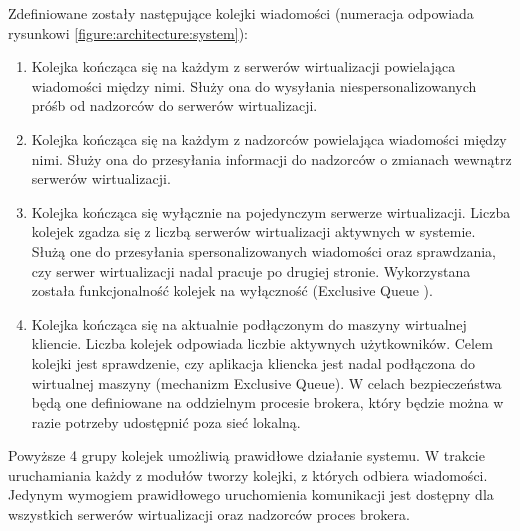 \documentclass[../opis-rozwiazania.tex]{subfiles}
\begin{document}
Zdefiniowane zostały następujące kolejki wiadomości (numeracja odpowiada rysunkowi \ref{figure:architecture:system}):
\begin{enumerate}[label=(\Roman*)]
  \item \label{modules:broker:queue-virtsrv} Kolejka kończąca się na każdym z serwerów wirtualizacji powielająca wiadomości między nimi.
        Służy ona do wysyłania niespersonalizowanych próśb od nadzorców do serwerów wirtualizacji.
  \item \label{modules:broker:queue-overseers} Kolejka kończąca się na każdym z nadzorców powielająca wiadomości między nimi.
        Służy ona do przesyłania informacji do nadzorców o zmianach wewnątrz serwerów wirtualizacji.
  \item \label{modules:broker:queue-exclusive} Kolejka kończąca się wyłącznie na pojedynczym serwerze wirtualizacji.
        Liczba kolejek zgadza się z liczbą serwerów wirtualizacji aktywnych w systemie.
        Służą one do przesyłania spersonalizowanych wiadomości oraz sprawdzania, czy serwer wirtualizacji nadal pracuje po drugiej stronie.
        Wykorzystana została funkcjonalność kolejek na wyłączność (Exclusive Queue \parencite{xrdp-clients}).
  \item \label{modules:broker:queue-users} Kolejka kończąca się na aktualnie podłączonym do maszyny wirtualnej kliencie.
        Liczba kolejek odpowiada liczbie aktywnych użytkowników.
        Celem kolejki jest sprawdzenie, czy aplikacja kliencka jest nadal podłączona do wirtualnej maszyny (mechanizm Exclusive Queue).
        W celach bezpieczeństwa będą one definiowane na oddzielnym procesie brokera, który będzie można w razie potrzeby udostępnić poza sieć lokalną.
\end{enumerate}

Powyższe 4 grupy kolejek umożliwią prawidłowe działanie systemu.
W trakcie uruchamiania każdy z modułów tworzy kolejki, z których odbiera wiadomości.
Jedynym wymogiem prawidłowego uruchomienia komunikacji jest dostępny dla wszystkich serwerów wirtualizacji oraz nadzorców proces brokera.
\end{document}
